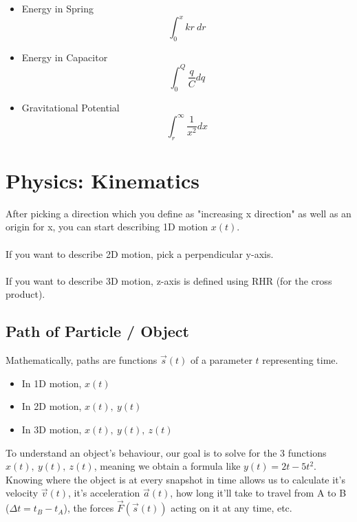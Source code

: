 \documentclass{article}
\begin{document}
\begin{itemize}
    \item Energy in Spring
        $$\int_0^x kr\ dr$$
    \item Energy in Capacitor
        $$\int_0^Q \frac{q}{C} dq$$
    \item Gravitational Potential
        $$\int_{r}^{\infty} \frac{1}{x^2} dx$$
\end{itemize}

\section{Physics: Kinematics}

After picking a direction which you define as "increasing x direction" as well as an origin for x, you can start describing 1D motion $x(t)$.\\
\\
If you want to describe 2D motion, pick a perpendicular y-axis. \\
\\
If you want to describe 3D motion, z-axis is defined using RHR (for the cross product).
\subsection{Path of Particle / Object}
Mathematically, paths are functions $\vec{s}(t)$ of a parameter $t$ representing time. 
\begin{itemize}
    \item In 1D motion, $x(t)$ 
    \item In 2D motion, $x(t),\ y(t)$
    \item In 3D motion, $x(t),\ y(t),\ z(t)$
\end{itemize}
To understand an object's behaviour, our goal is to solve for the 3 functions $x(t),\ y(t),\ z(t)$, meaning we obtain a formula like $y(t) = 2 t - 5 t^2$. Knowing where the object is at every snapshot in time allows us to calculate it's velocity $\vec{v}(t)$, it's acceleration $\vec{a}(t)$, how long it'll take to travel from A to B ($\Delta t = t_B - t_A$), the forces $\vec{F}(\vec{s}(t))$ acting on it at any time, etc.
\end{document}
